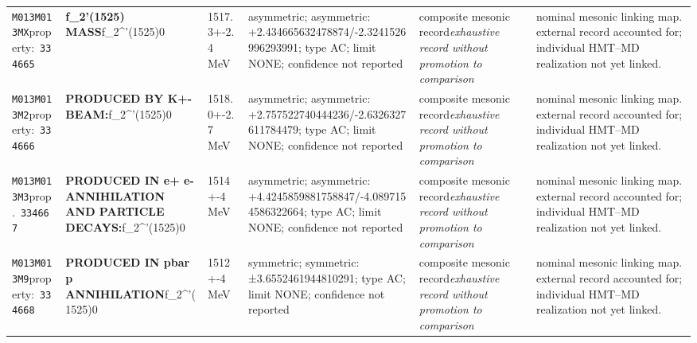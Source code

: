 \begin{landscape}
\begin{longtable}{L{1.85cm}L{4.45cm}L{2.35cm}L{4.05cm}L{3.35cm}L{7.15cm}}
\texttt{M013}\newline \texttt{M013MX}\newline property:\ \texttt{334665} & \textbf{f\_\allowbreak{}2'(1525) MASS}\newline f\_\allowbreak{}2\textasciicircum{}'(1525)0 & 1517.3+-2.4\,MeV & asymmetric; asymmetric: +2.434665632478874/-2.3241526996293991; type AC; limit NONE; confidence not reported & composite mesonic record\newline \emph{exhaustive record without promotion to comparison} & nominal mesonic linking map. external record accounted for; individual HMT--MD realization not yet linked. \\
\texttt{M013}\newline \texttt{M013M2}\newline property:\ \texttt{334666} & \textbf{PRODUCED BY K+- BEAM:}\newline f\_\allowbreak{}2\textasciicircum{}'(1525)0 & 1518.0+-2.7\,MeV & asymmetric; asymmetric: +2.757522740444236/-2.6326327611784479; type AC; limit NONE; confidence not reported & composite mesonic record\newline \emph{exhaustive record without promotion to comparison} & nominal mesonic linking map. external record accounted for; individual HMT--MD realization not yet linked. \\
\texttt{M013}\newline \texttt{M013M3}\newline prop.\ \texttt{334667} & \textbf{PRODUCED IN e+ e- ANNIHILATION AND PARTICLE DECAYS:}\newline f\_\allowbreak{}2\textasciicircum{}'(1525)0 & 1514+-4\,MeV & asymmetric; asymmetric: +4.4245859881758847/-4.0897154586322664; type AC; limit NONE; confidence not reported & composite mesonic record\newline \emph{exhaustive record without promotion to comparison} & nominal mesonic linking map. external record accounted for; individual HMT--MD realization not yet linked. \\
\texttt{M013}\newline \texttt{M013M9}\newline property:\ \texttt{334668} & \textbf{PRODUCED IN pbar p ANNIHILATION}\newline f\_\allowbreak{}2\textasciicircum{}'(1525)0 & 1512+-4\,MeV & symmetric; symmetric: ±3.6552461944810291; type AC; limit NONE; confidence not reported & composite mesonic record\newline \emph{exhaustive record without promotion to comparison} & nominal mesonic linking map. external record accounted for; individual HMT--MD realization not yet linked. \\

\end{longtable}
\end{landscape}
